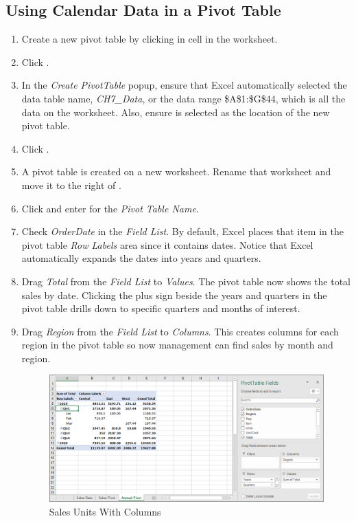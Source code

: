 \subsection{Using Calendar Data in a Pivot Table}

\begin{enumbox}
	\begin{enumerate}
		\item Create a new pivot table by clicking in cell  in the  worksheet.
		\item Click .
		\item In the \textit{Create PivotTable} popup, ensure that Excel automatically selected the data table name, \textit{CH7\_Data}, or the data range \$A\$1:\$G\$44, which is all the data on the worksheet. Also, ensure  is selected as the location of the new pivot table. 
		\item Click .
		\item A pivot table is created on a new worksheet. Rename that worksheet  and move it to the right of .
		\item Click  and enter  for the \textit{Pivot Table Name}.
		\item Check \textit{OrderDate} in the \textit{Field List}. By default, Excel places that item in the pivot table \textit{Row Labels} area since it contains dates. Notice that Excel automatically expands the dates into years and quarters.
		\item Drag \textit{Total} from the \textit{Field List} to \textit{Values}. The pivot table now shows the total sales by date. Clicking the plus sign beside the years and quarters in the pivot table drills down to specific quarters and months of interest.
		\item Drag \textit{Region} from the \textit{Field List} to \textit{Columns}. This creates columns for each region in the pivot table so now management can find sales by month and region.

		\begin{figure}[H]
			\centering
			\includegraphics[width=\maxwidth{.95\linewidth}]{gfx/ch07_fig21}
			\caption{Sales Units With Columns}
			\label{07:fig21}
		\end{figure}


\end{enumerate}
\end{enumbox}
